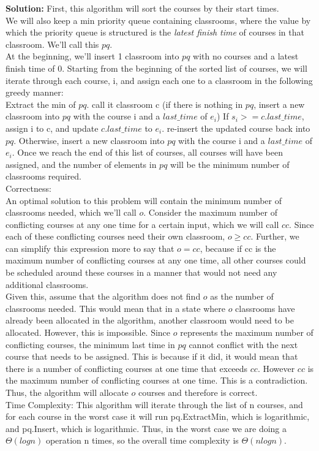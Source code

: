 \documentclass[10pt]{article}
\newcommand{\solution}[1]{\color{blue}\hfill\break\noindent\textbf{Solution:} #1\color{black}}
\begin{document}
\solution{
    First, this algorithm will sort the courses by their start times. \\
    We will also keep a min priority queue containing classrooms, where the value by which the priority queue is structured is the \emph{latest finish time} of courses in that classroom. We'll call this $pq$. \\
    At the beginning, we'll insert 1 classroom into $pq$ with no courses and a latest finish time of 0.
    Starting from the beginning of the sorted list of courses, we will iterate through each course, i, and assign each one to a classroom in the following greedy manner: \\
    Extract the min of $pq$. call it classroom c (if there is nothing in $pq$, insert a new classroom into $pq$ with the course i and a $last\_time$ of $e_i$)
    If $s_i >= c.last\_time$, assign i to c, and update $c.last\_time$ to $e_i$. re-insert the updated course back into $pq$.
    Otherwise, insert a new classroom into $pq$ with the course i and a $last\_time$ of $e_i$.
    Once we reach the end of this list of courses, all courses will have been assigned, and the number of elements in $pq$ will be the minimum number of classrooms required. \\
    Correctness: \\
    An optimal solution to this problem will contain the minimum number of classrooms needed, which we'll call $o$. Consider the maximum number of conflicting courses at any one time for a certain input, which we will call $cc$. Since each of these conflicting courses need their own classroom, $o \geq cc$. Further, we can simplify this expression more to say that $o = cc$, because if cc is the maximum number of conflicting courses at any one time, all other courses could be scheduled around these courses in a manner that would not need any additional classrooms. \\
    Given this, assume that the algorithm does not find $o$ as the number of classrooms needed. This would mean that in a state where $o$ classrooms have already been allocated in the algorithm, another classroom would need to be allocated. However, this is impossible. Since $o$ represents the maximum number of conflicting courses, the minimum last time in $pq$ cannot conflict with the next course that needs to be assigned. This is because if it did, it would mean that there is a number of conflicting courses at one time that exceeds $cc$. However $cc$ is the maximum number of conflicting courses at one time. This is a contradiction. Thus, the algorithm will allocate $o$ courses and therefore is correct. \\
    Time Complexity:
    This algorithm will iterate through the list of n courses, and for each course in the worst case it will run pq.ExtractMin, which is logarithmic, and pq.Insert, which is logarithmic. Thus, in the worst case we are doing a $\Theta(logn)$ operation n times, so the overall time complexity is $\Theta(nlogn)$.
    
}
\end{document}
